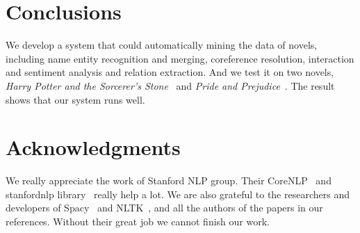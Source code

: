 \documentclass[11pt]{article}
\begin{document}
\section{Conclusions} %
\label{sec:length}
We develop a system that could automatically mining the data of novels, including name entity recognition and merging, coreference resolution, interaction and sentiment analysis and relation extraction. And we test it on two novels, \textit{Harry Potter and the Sorcerer's Stone}~\cite{harrypotter} and \textit{Pride and Prejudice}~\cite{pride}. The result shows that our system runs well.

\section*{Acknowledgments} %

We really appreciate the work of Stanford NLP group. Their CoreNLP~\cite{corenlp} and stanfordnlp library~\cite{stanfordnlp} really help a lot. We are also grateful to the researchers and developers of Spacy~\cite{honnibal-johnson:2015:EMNLP} and NLTK~\cite{Loper02nltk:the}, and all the authors of the papers in our references. Without their great job we cannot finish our work.



\end{document}
